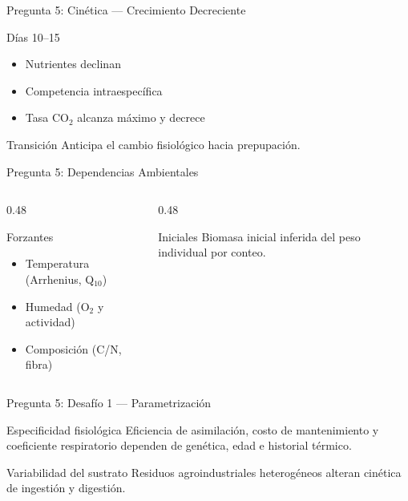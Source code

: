 \documentclass[aspectratio=169, 11pt]{beamer}
\begin{document}
\begin{frame}{Pregunta 5: Cinética --- Crecimiento Decreciente}
\begin{alertblock}{Días 10--15}
\footnotesize
\begin{itemize}
    \item Nutrientes declinan
    \item Competencia intraespecífica
    \item Tasa CO$_2$ alcanza máximo y decrece
\end{itemize}
\end{alertblock}
\begin{block}{Transición}
\footnotesize
Anticipa el cambio fisiológico hacia prepupación.
\end{block}
\end{frame}

\begin{frame}{Pregunta 5: Dependencias Ambientales}
\begin{columns}[T]
\begin{column}{0.48\textwidth}
\begin{block}{Forzantes}
\footnotesize
\begin{itemize}
    \item Temperatura (Arrhenius, Q$_{10}$)
    \item Humedad (O$_2$ y actividad)
    \item Composición (C/N, fibra)
\end{itemize}
\end{block}
\end{column}
\begin{column}{0.48\textwidth}
\begin{block}{Iniciales}
\footnotesize
Biomasa inicial inferida del peso individual por conteo.
\end{block}
\end{column}
\end{columns}
\end{frame}

\begin{frame}{Pregunta 5: Desafío 1 --- Parametrización}
\begin{alertblock}{Especificidad fisiológica}
\footnotesize
Eficiencia de asimilación, costo de mantenimiento y coeficiente respiratorio dependen de genética, edad e historial térmico.
\end{alertblock}
\begin{block}{Variabilidad del sustrato}
\footnotesize
Residuos agroindustriales heterogéneos alteran cinética de ingestión y digestión.
\end{block}
\end{frame}
\end{document}
